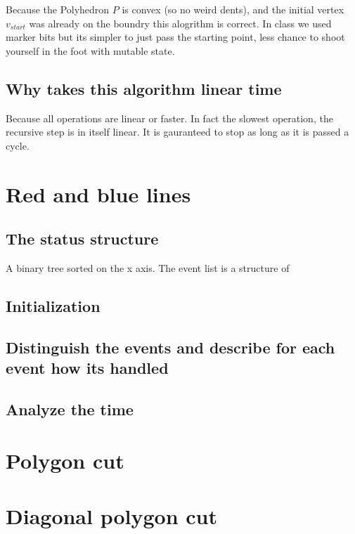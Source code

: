 \documentclass{article}
\begin{document}
Because the Polyhedron $P$ is convex (so no weird dents), and
the initial vertex $v_{start}$ was already on the boundry this
alogrithm is correct.
In class we used marker bits but its simpler to just pass the
starting point, less chance to shoot yourself in the foot with
mutable state.

\subsection{Why takes this algorithm linear time}
Because all operations are linear or faster. In fact the slowest
operation, the recursive step is in itself linear. It is gauranteed to stop
as long as it is passed a cycle.

\section{Red and blue lines}
\subsection{The status structure}
A binary tree sorted on the x axis.
The event list is a structure of 
\subsection{Initialization}

\subsection{Distinguish the events and describe for each event how its handled}
\subsection{Analyze the time}

\section{Polygon cut}
\section{Diagonal polygon cut}
\end{document}
